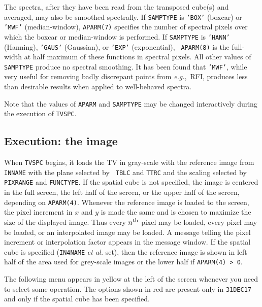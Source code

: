 \documentclass[twoside]{article}
\newcommand{\Hi}[1]{\textcolor{hicol}{#1}}
\newcommand{\eg}{{\it e.g.},}
\begin{document}
The spectra, after they have been read from the transposed cube(s) and
averaged, may also be smoothed spectrally.  If {\tt SAMPTYPE} is
{\tt 'BOX'} (boxcar) or {\tt 'MWF'} (median-window), {\tt APARM(7)}
specifies the number of spectral pixels over which the boxcar or
median-window is performed.  If {\tt SAMPTYPE} is {\tt 'HANN'}
(Hanning), {\tt 'GAUS'} (Gaussian), or {\tt 'EXP'} (exponential), {\tt
  APARM(8)} is the full-width at half maximum of these functions in
spectral pixels.  All other values of {\tt SAMPTYPE} produce no
spectral smoothing.  It has been found that {\tt 'MWF'}, while very
useful for removing badly discrepant points from \eg\ RFI, produces
less than desirable results when applied to well-behaved spectra.

Note that the values of {\tt APARM} and {\tt SAMPTYPE} may be changed
interactively during the execution of {\tt TVSPC}\@.

\subsection{Execution: the image}

When {\tt TVSPC} begins, it loads the TV in gray-scale with the
reference image from {\tt INNAME} with the plane selected by {\tt
  TBLC} and {\tt TTRC} and the scaling selected by {\tt PIXRANGE} and
{\tt FUNCTYPE}\@.  If the spatial cube is not specified, the image is
centered in the full screen, the left half of the screen, or the upper
half of the screen, depending on {\tt APARM(4)}\@.  Whenever the
reference image is loaded to the screen, the pixel increment in $x$
and $y$ is made the same and is chosen to maximize the size of the
displayed image.  Thus every $n^{\rm th}$ pixel may be loaded, every
pixel may be loaded, or an interpolated image may be loaded.  A
message telling the pixel increment or interpolation factor appears in
the message window.  If the spatial cube is specified ({\tt IN4NAME}
{\it et al.} set), then the reference image is shown in left half of
the area used for grey-scale images or the lower half if {\tt APARM(4)
  > 0}.

The following menu appears in yellow at the left of the screen
whenever you need to select some operation.  The options shown in
\Hi{red} are present only in {\tt 31DEC17} and only if the spatial
cube has been specified.
\end{document}
